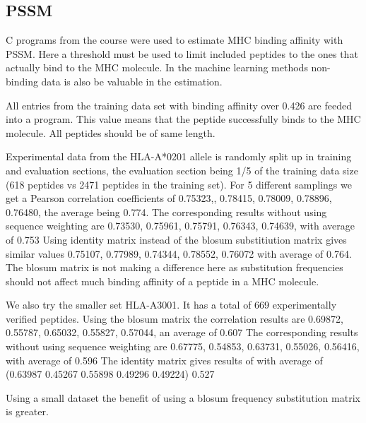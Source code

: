 
\subsection*{PSSM}

C programs from the course were used to estimate MHC binding affinity with PSSM. 
Here a threshold must be used to limit included peptides to the ones that actually bind to the MHC molecule. 
In the machine learning methods non-binding data is also be valuable in the estimation.

All entries from the training data set with binding affinity over 0.426 are feeded into a program. 
This value means that the peptide successfully binds to the MHC molecule. All peptides should be of same length.

Experimental data from the HLA-A*0201 allele is randomly split up in training and evaluation sections, the evaluation section being 1/5 of the training data size (618 peptides vs 2471 peptides in the training set).
For 5 different samplings we get a Pearson correlation coefficients of {0.75323,, 0.78415, 0.78009, 0.78896, 0.76480}, the average being 0.774.
The corresponding results without using sequence weighting are {0.73530, 0.75961, 0.75791, 0.76343, 0.74639}, with average of 0.753
Using identity matrix instead of the blosum substitiution matrix gives similar values {0.75107, 0.77989, 0.74344, 0.78552, 0.76072} with average of 0.764.
The blosum matrix is not making a difference here as substitution frequencies should not affect much binding affinity of a peptide in a MHC molecule.

We also try the smaller set HLA-A3001. It has a total of 669 experimentally verified peptides.
Using the blosum matrix the correlation results are {0.69872, 0.55787, 0.65032, 0.55827, 0.57044}, an average of 0.607
The corresponding results without using sequence weighting are {0.67775, 0.54853, 0.63731, 0.55026, 0.56416}, with average of 0.596
The identity matrix gives results of with average of (0.63987 0.45267 0.55898 0.49296 0.49224) 0.527 

Using a small dataset the benefit of using a blosum frequency substitution matrix is greater.

